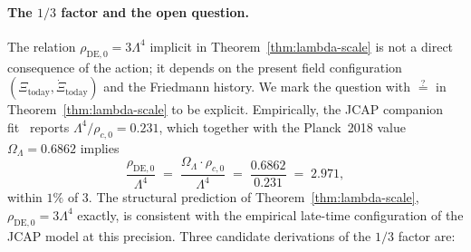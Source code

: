 \documentclass[11pt,reqno]{amsart}
\theoremstyle{plain}
\theoremstyle{definition}
\theoremstyle{remark}
\begin{document}

\paragraph{The $1/3$ factor and the open question.}
The relation $\rho_\mathrm{DE,0} = 3 \Lambda^{4}$ implicit in
Theorem~\ref{thm:lambda-scale} is not a direct consequence of
the action; it depends on the present field configuration
$(\Xi_\mathrm{today}, \dot\Xi_\mathrm{today})$ and the Friedmann
history. We mark the question with $\stackrel{?}{=}$ in
Theorem~\ref{thm:lambda-scale} to be explicit. Empirically,
the JCAP companion fit~\cite{SandersGish2026JCAP}
reports $\Lambda^{4}/\rho_{c,0} = 0.231$, which together with
the Planck~2018 value $\Omega_\Lambda = 0.6862$ implies
\[
  \frac{\rho_\mathrm{DE,0}}{\Lambda^{4}}
  \;=\; \frac{\Omega_\Lambda \cdot \rho_{c,0}}{\Lambda^{4}}
  \;=\; \frac{0.6862}{0.231}
  \;=\; 2.971,
\]
within $1\%$ of $3$. The structural prediction of
Theorem~\ref{thm:lambda-scale}, $\rho_\mathrm{DE,0} = 3 \Lambda^{4}$
exactly, is consistent with the empirical late-time
configuration of the JCAP model at this precision. Three
candidate derivations of the $1/3$ factor are:
\end{document}

